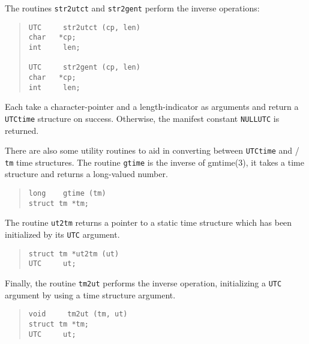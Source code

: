 The routines \verb"str2utct" and \verb"str2gent" perform the inverse
operations:
\begin{quote}\small\begin{verbatim}
UTC     str2utct (cp, len)
char   *cp;
int     len;

UTC     str2gent (cp, len)
char   *cp;
int     len;
\end{verbatim}\end{quote}
Each take a character-pointer and a length-indicator as arguments and return a
\verb"UTCtime" structure on success.
Otherwise, the manifest constant \verb"NULLUTC" is returned.

There are also some utility routines to aid in converting between
\verb"UTCtime" and \unix/ \verb"tm" time structures.
The routine \verb"gtime" is the inverse of \man gmtime(3),
it takes a time structure and returns a long-valued number.
\begin{quote}\small\begin{verbatim}
long    gtime (tm)
struct tm *tm;
\end{verbatim}\end{quote}
The routine \verb"ut2tm" returns a pointer to a static time structure
which has been initialized by its \verb"UTC" argument.
\begin{quote}\small\begin{verbatim}
struct tm *ut2tm (ut)
UTC     ut;
\end{verbatim}\end{quote}
Finally, the routine \verb"tm2ut" performs the inverse operation,
initializing a \verb"UTC" argument by using a time structure argument.
\begin{quote}\small\begin{verbatim}
void     tm2ut (tm, ut)
struct tm *tm;
UTC     ut;
\end{verbatim}\end{quote}

